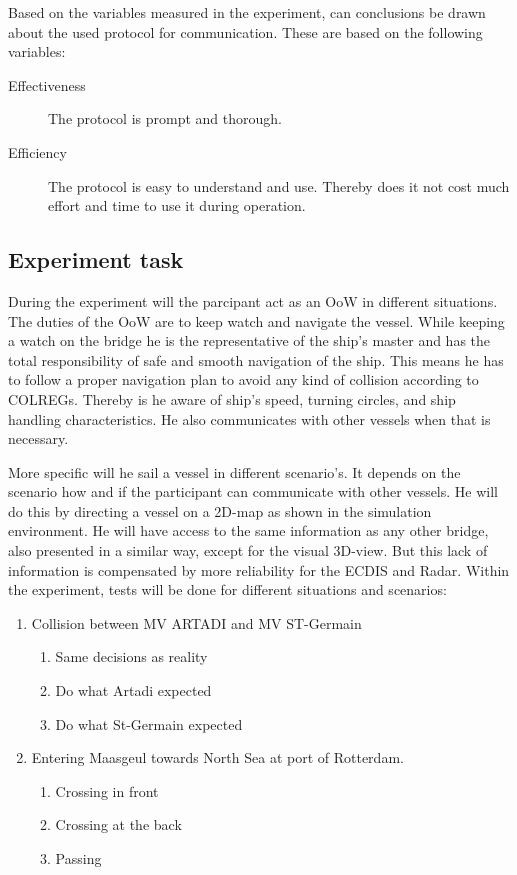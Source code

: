 Based on the variables measured in the experiment, can conclusions be drawn about the used protocol for communication. These are based on the following variables:
\begin{description}
	\item [Effectiveness] The protocol is prompt and thorough.
	\item [Efficiency] The protocol is easy to understand and use. Thereby does it not cost much effort and time to use it during operation.
\end{description}

\subsection{Experiment task}
\label{ssec:experiment-task}
During the experiment will the parcipant act as an \acf{OoW} in different situations. The duties of the \ac{OoW} are to keep watch and navigate the vessel. While keeping a watch on the bridge he is the representative of the ship’s master and has the total responsibility of safe and smooth navigation of the ship. This means he has to follow a proper navigation plan to avoid any kind of collision according to COLREGs. Thereby is he aware of ship’s speed, turning circles, and ship handling characteristics. He also communicates with other vessels when that is necessary.

More specific will he sail a vessel in different scenario's. It depends on the scenario how and if the participant can communicate with other vessels. He will do this by directing a vessel on a 2D-map as shown in the simulation environment. He will have access to the same information as any other bridge, also presented in a similar way, except for the visual 3D-view. But this lack of information is compensated by more reliability for the ECDIS and Radar.
Within the experiment, tests will be done for different situations and scenarios: 

\begin{enumerate}
	\item Collision between MV ARTADI and MV ST-Germain
	\begin{enumerate}[label=(\Alph*)]
		\item Same decisions as reality
		\item Do what Artadi expected
		\item Do what St-Germain expected
	\end{enumerate}
	\item Entering Maasgeul towards North Sea at port of Rotterdam.
	\begin{enumerate}[label=(\Alph*)]
		\item Crossing in front
		\item Crossing at the back
		\item Passing
	\end{enumerate}
\end{enumerate}

